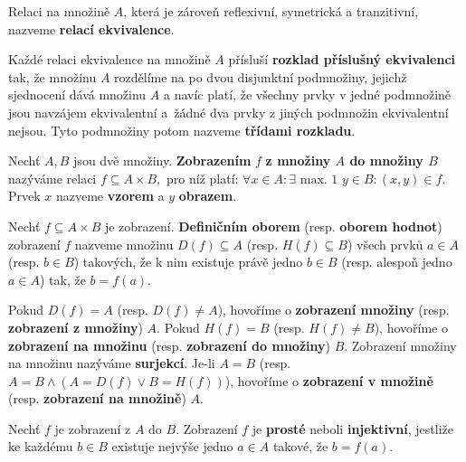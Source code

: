 \begin{definition}\label{ekvivalence}
  Relaci na množině $A$, která je zároveň reflexivní, symetrická a tranzitivní, nazveme \textbf{relací ekvivalence}.
\end{definition}

\begin{pozn}\label{rozkladprislusnyekvivalenci}
  Každé relaci ekvivalence na množině $A$ přísluší \textbf{rozklad příslušný ekvivalenci} tak, že množinu $A$ rozdělíme na po dvou disjunktní podmnožiny,
  jejichž sjednocení dává množinu $A$ a navíc platí, že všechny prvky v jedné podmnožině jsou navzájem ekvivalentní a~žádné dva prvky z jiných podmnožin ekvivalentní nejsou. Tyto podmnožiny potom nazveme \textbf{třídami rozkladu}.
\end{pozn}

\begin{definition}
  Nechť $A,B$ jsou dvě množiny. \textbf{Zobrazením} $f$ \textbf{z množiny $A$ do množiny $B$} nazýváme relaci $f\subseteq A \times B,$ pro níž platí: $\forall x \in A: \exists \text{ max. 1 } y \in B: (x,y) \in f$. Prvek $x$ nazveme \textbf{vzorem} a $y$ \textbf{obrazem}.
\end{definition}

\begin{definition}
  Nechť $f\subseteq A\times B$ je zobrazení. \textbf{Definičním oborem} (resp. \textbf{oborem hodnot}) zobrazení $f$ nazveme množinu $D(f)\subseteq A$
  (resp. $H(f)\subseteq B$) všech prvků $a\in A$ (resp. $b\in B$) takových, že k nim existuje právě jedno $b\in B$ (resp. alespoň jedno $a\in A$) tak, že $b=f(a)$.
\end{definition}

\begin{definition}
  Pokud $D(f) = A$ (resp. $D(f)\ne A$), hovoříme o \textbf{zobrazení množiny} (resp. \textbf{zobrazení z množiny}) $A$. Pokud $H(f)=B$ (resp. $H(f)\ne B$), hovoříme o \textbf{zobrazení na množinu} (resp. \textbf{zobrazení do množiny}) $B$.
  Zobrazení množiny na množinu nazýváme \textbf{surjekcí}. Je-li $A=B$ (resp. $A=B \land ( A = D(f) \lor B = H(f))$), hovoříme o \textbf{zobrazení v množině} (resp. \textbf{zobrazení na množině}) $A$.
\end{definition}

\begin{definition}
  Nechť $f$ je zobrazení z $A$ do $B$. Zobrazení $f$ je \textbf{prosté} neboli \textbf{injektivní}, jestliže ke každému $b\in B$ existuje nejvýše jedno $a \in A$ takové, že $b=f(a).$
\end{definition}

